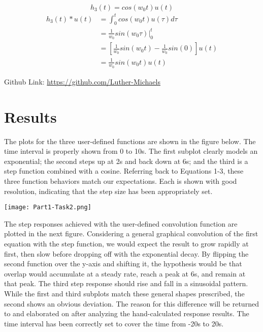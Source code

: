 \documentclass[12pt]{report}
\begin{document}
\begin{equation*}
	h_3(t) = cos(w_0t)u(t)
\end{equation*}
\begin{align*}
	h_3(t) * u(t) &= \int_{0}^{t}cos(w_0t) u(\tau) d\tau \\
	&= \frac{1}{w_0} sin(w_0\tau) |_{0}^{t} \\
	&= [\frac{1}{w_0} sin(w_0t) - \frac{1}{w_0} sin(0)] u(t) \\
	&= \frac{1}{w_0} sin(w_0t)u(t)
\end{align*}

Github Link: \url{https://github.com/Luther-Michaels}
	
\section{Results}
	
The plots for the three user-defined functions are shown in the figure below. The time interval is properly shown from 0 to 10s. The first subplot clearly models an exponential; the second steps up at 2s and back down at 6s; and the third is a step function combined with a cosine. Referring back to Equations 1-3, these three function behaviors match our expectations. Each is shown with good resolution, indicating that the step size has been appropriately set. \\

\begin{center}
		\texttt{[image: Part1-Task2.png]}\\[1.0 cm]
\end{center}

The step responses achieved with the user-defined convolution function are plotted in the next figure. Considering a general graphical convolution of the first equation with the step function, we would expect the result to grow rapidly at first, then slow before dropping off with the exponential decay. By flipping the second function over the y-axis and shifting it, the hypothesis would be that overlap would accumulate at a steady rate, reach a peak at 6s, and remain at that peak. The third step response should rise and fall in a sinusoidal pattern. \\

While the first and third subplots match these general shapes prescribed, the second shows an obvious deviation. The reason for this difference will be returned to and elaborated on after analyzing the hand-calculated response results. The time interval has been correctly set to cover the time from -20s to 20s. \\
\end{document}
